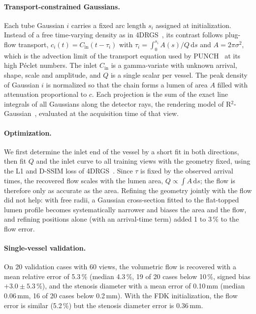
\paragraph{Transport-constrained Gaussians.}
Each tube Gaussian $i$ carries a fixed arc length $s_i$ assigned at
initialization. Instead of a free time-varying density as in
4DRGS~\cite{liu2025fourdrgs}, its contrast follows plug-flow transport,
$c_i(t) = C_{\mathrm{in}}(t - \tau_i)$ with
$\tau_i = \int_0^{s_i} A(s)/Q\,\mathrm{d}s$ and $A = 2\pi\sigma^2$,
which is the advection limit of the transport equation used by
PUNCH~\cite{thakur2026punch} at its high P\'eclet numbers. The inlet
$C_{\mathrm{in}}$ is a gamma-variate with unknown arrival, shape, scale
and amplitude, and $Q$ is a single scalar per vessel. The peak density of
Gaussian $i$ is normalized so that the chain forms a lumen of area $A$
filled with attenuation proportional to $c$. Each projection is the sum
of the exact line integrals of all Gaussians along the detector rays, the
rendering model of R$^2$-Gaussian~\cite{zha2024r2gaussian}, evaluated at the
acquisition time of that view.

\paragraph{Optimization.}
We first determine the inlet end of the vessel by a short fit in both
directions, then fit $Q$ and the inlet curve to all training views with
the geometry fixed, using the L1 and D-SSIM loss of
4DRGS~\cite{liu2025fourdrgs}. Since $\tau$ is fixed by the observed
arrival times, the recovered flow scales with the lumen area,
$Q \propto \int A\,\mathrm{d}s$; the flow is therefore only as accurate
as the area. Refining the geometry jointly with the flow did not help:
with free radii, a Gaussian cross-section fitted to the flat-topped lumen
profile becomes systematically narrower and biases the area and the flow,
and refining positions alone (with an arrival-time term) added 1 to
3\,\% to the flow error.

\paragraph{Single-vessel validation.}
On 20 validation cases with 60 views, the volumetric flow is recovered
with a mean relative error of 5.3\,\% (median 4.3\,\%, 19 of 20 cases
below 10\,\%, signed bias $+3.0 \pm 5.3$\,\%), and the stenosis diameter
with a mean error of 0.10\,mm (median 0.06\,mm, 16 of 20 cases below
0.2\,mm). With the FDK initialization, the flow error is similar
(5.2\,\%) but the stenosis diameter error is 0.36\,mm.
